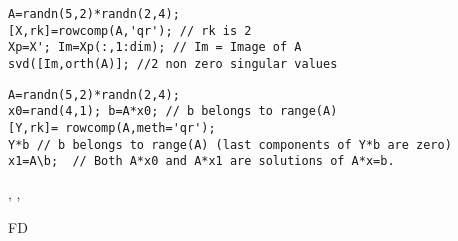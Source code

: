 \begin{examples}
\begin{Verbatim}
A=randn(5,2)*randn(2,4);
[X,rk]=rowcomp(A,'qr'); // rk is 2 
Xp=X'; Im=Xp(:,1:dim); // Im = Image of A 
svd([Im,orth(A)]; //2 non zero singular values
\end{Verbatim}

\begin{Verbatim}
A=randn(5,2)*randn(2,4);
x0=rand(4,1); b=A*x0; // b belongs to range(A)  
[Y,rk]= rowcomp(A,meth='qr');
Y*b // b belongs to range(A) (last components of Y*b are zero)   
x1=A\b;  // Both A*x0 and A*x1 are solutions of A*x=b.
\end{Verbatim}
\end{examples}

\begin{manseealso}
  , , 
\end{manseealso}

\begin{authors}
   FD
\end{authors}
